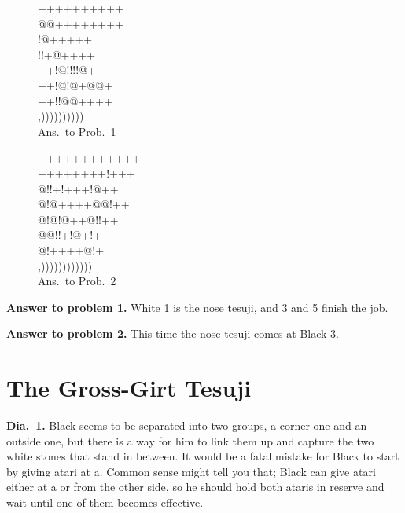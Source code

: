 \documentclass[mcrownvopaper,10pt,twopage,onecolumn,final]{memoir}
\begin{document}
\begin{figure}[ht]
    \begin{minipage}[c]{0.45\linewidth}
        \centering    
        {\gnos%
        ++++++++++\\
        @@++++++++\\
        !@+{\gnosw{}}+{\gnosw{}}+++\\
        !!+@{\gnosb{}}++++\\
        ++!@!!!!@+\\
        ++!@!@+@@+\\
        ++!!@@++++\\
        ,))))))))))\\
        }
        Ans.\ to Prob.\ 1
    \end{minipage}%
    \begin{minipage}[c]{0.55\linewidth}
        \centering    
        {\gnos%
        ++++++++++++\\
        ++++++++!+++\\
        @!!+!+++!@++\\
        @!@++++@@!++\\
        @!@!@++@!!++\\
        @@!!+{\gnosb{}}{\gnosw{}}!@+!+\\
        @!+++{\gnosb{}}{\gnosw{}}{\gnosb{}}+@!+\\
        ,))))))))))))\\
        }
        Ans.\ to Prob.\ 2
    \end{minipage}%
\end{figure}

\noindent
\textbf{Answer to problem 1.} White 1 is the nose tesuji, and 3 and 5 finish the
job.

\noindent
\textbf{Answer to problem 2.} This time the nose tesuji comes at Black 3.

\section{The Gross-Girt Tesuji}

\noindent
\textbf{Dia.\ 1.} Black seems to be separated into two groups, a corner one and
an outside one, but there is a way for him to link them up and capture
the two white stones that stand in between.
It would be a fatal mistake for Black to start by giving atari at a.
Common sense might tell you that; Black can give atari either at a or
from the other side, so he should hold both ataris in reserve and wait
until one of them becomes effective.
\end{document}
